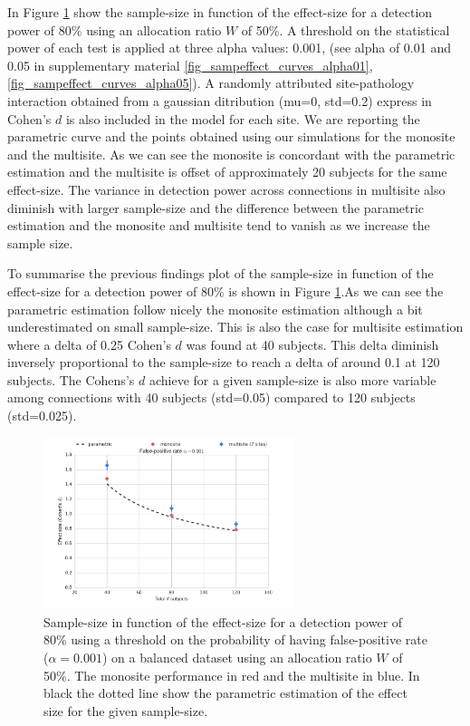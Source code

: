 \documentclass[authoryear]{elsarticle}
\begin{document}
In Figure \ref{fig_sampeffect_curves_alpha001} show the sample-size in function of the effect-size for a detection power of 80\% using an allocation ratio $W$ of 50\%. A threshold on the statistical power of each test is applied at three alpha values: 0.001, (see alpha of 0.01 and 0.05 in supplementary material \ref{fig_sampeffect_curves_alpha01},\ref{fig_sampeffect_curves_alpha05}). A randomly attributed site-pathology interaction obtained from a gaussian ditribution (mu=0, std=0.2) express in Cohen’s $d$ is also included in the model for each site. We are reporting the parametric curve and the points obtained using our simulations for the monosite and the multisite. As we can see the monosite is concordant with the parametric estimation and the multisite is offset of approximately 20 subjects for the same effect-size. The variance in detection power across connections in multisite also diminish with larger sample-size and the difference between the parametric estimation and the monosite and multisite tend to vanish as we increase the sample size.

To summarise the previous findings plot of the sample-size in function of the effect-size for a detection power of 80\% is shown in Figure \ref{fig_sampeffect_curves_alpha001}.As we can see the parametric estimation follow nicely the monosite estimation although a bit underestimated on small sample-size. This is also the case for multisite estimation where a delta of 0.25 Cohen's $d$ was found at 40 subjects. This delta diminish inversely proportional to the sample-size to reach a delta of around 0.1 at 120 subjects. The Cohens's $d$ achieve for a given sample-size is also more variable among connections with 40 subjects (std=0.05) compared to 120 subjects (std=0.025).

\begin{figure}[tbp]
\centering
\includegraphics[width=0.65\textwidth]{../figures/samplesize_effectsize_pow80_alpha001.png}
\caption[]{
Sample-size in function of the effect-size for a detection power of 80\% using a threshold on the probability of having false-positive rate ($\alpha=0.001$) on a balanced dataset using an allocation ratio $W$ of 50\%. The monosite performance in red and the multisite in blue. In black the dotted line show the parametric estimation of the effect size for the given sample-size.
}
\label{fig_sampeffect_curves_alpha001}
\end{figure}
\end{document}
